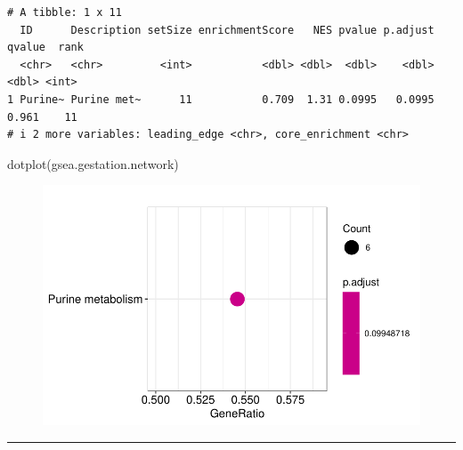 \documentclass[
  24px,
  letterpaper,
  DIV=11,
  numbers=noendperiod]{scrartcl}
\newenvironment{Shaded}{\begin{snugshade}}{\end{snugshade}}
\newcommand{\AttributeTok}[1]{\textcolor[rgb]{0.40,0.45,0.13}{#1}}
\newcommand{\DecValTok}[1]{\textcolor[rgb]{0.68,0.00,0.00}{#1}}
\newcommand{\FunctionTok}[1]{\textcolor[rgb]{0.28,0.35,0.67}{#1}}
\newcommand{\NormalTok}[1]{\textcolor[rgb]{0.00,0.23,0.31}{#1}}
\newcommand{\SpecialCharTok}[1]{\textcolor[rgb]{0.37,0.37,0.37}{#1}}
\begin{document}
\begin{verbatim}
# A tibble: 1 x 11
  ID      Description setSize enrichmentScore   NES pvalue p.adjust qvalue  rank
  <chr>   <chr>         <int>           <dbl> <dbl>  <dbl>    <dbl>  <dbl> <int>
1 Purine~ Purine met~      11           0.709  1.31 0.0995   0.0995  0.961    11
# i 2 more variables: leading_edge <chr>, core_enrichment <chr>
\end{verbatim}

\begin{Shaded}
\begin{Highlighting}[]
\FunctionTok{dotplot}\NormalTok{(gsea.gestation.network)}
\end{Highlighting}
\end{Shaded}

\begin{figure}[H]

{\centering \includegraphics{index_files/figure-pdf/unnamed-chunk-43-1.pdf}

}

\end{figure}

\begin{center}\rule{0.5\linewidth}{0.5pt}\end{center}

\begin{Shaded}
\end{Shaded}
\end{document}
